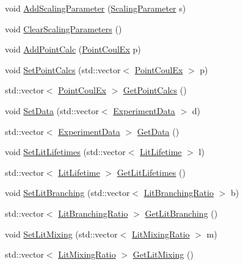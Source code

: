 \begin{DoxyCompactItemize}
\item 
void \hyperlink{classCoulExFitter_ab0bb6b9cb3f63281e4e310a359293e24}{Add\-Scaling\-Parameter} (\hyperlink{classScalingParameter}{Scaling\-Parameter} s)
\item 
void \hyperlink{classCoulExFitter_a379e336a5bf3534a68a2b30aae1b03d6}{Clear\-Scaling\-Parameters} ()
\item 
void \hyperlink{classCoulExFitter_aa61a8d54329e77a5a8ffc7d760a7acad}{Add\-Point\-Calc} (\hyperlink{classPointCoulEx}{Point\-Coul\-Ex} p)
\item 
void \hyperlink{classCoulExFitter_ad3dadcfe5be98bd37a9a0e10ba8866ef}{Set\-Point\-Calcs} (std\-::vector$<$ \hyperlink{classPointCoulEx}{Point\-Coul\-Ex} $>$ p)
\item 
std\-::vector$<$ \hyperlink{classPointCoulEx}{Point\-Coul\-Ex} $>$ \hyperlink{classCoulExFitter_af845588f78e360df8f1054b2b06b1320}{Get\-Point\-Calcs} ()
\item 
void \hyperlink{classCoulExFitter_a44ec14a6b681ac7feccdf2dc119a5450}{Set\-Data} (std\-::vector$<$ \hyperlink{classExperimentData}{Experiment\-Data} $>$ d)
\item 
std\-::vector$<$ \hyperlink{classExperimentData}{Experiment\-Data} $>$ \hyperlink{classCoulExFitter_a8bbef087dbeab8832c0cfb52b6b7f8de}{Get\-Data} ()
\item 
void \hyperlink{classCoulExFitter_a4404962fd56e3d1543061b5d141d655f}{Set\-Lit\-Lifetimes} (std\-::vector$<$ \hyperlink{classLitLifetime}{Lit\-Lifetime} $>$ l)
\item 
std\-::vector$<$ \hyperlink{classLitLifetime}{Lit\-Lifetime} $>$ \hyperlink{classCoulExFitter_a16cb5175295b5f14547db8dd63f95541}{Get\-Lit\-Lifetimes} ()
\item 
void \hyperlink{classCoulExFitter_a349703eec8df817afb031d536622af69}{Set\-Lit\-Branching} (std\-::vector$<$ \hyperlink{classLitBranchingRatio}{Lit\-Branching\-Ratio} $>$ b)
\item 
std\-::vector$<$ \hyperlink{classLitBranchingRatio}{Lit\-Branching\-Ratio} $>$ \hyperlink{classCoulExFitter_a74d75b806bee4687703d1611c7710ad8}{Get\-Lit\-Branching} ()
\item 
void \hyperlink{classCoulExFitter_a67e04682849c9234aa200006aa614f1a}{Set\-Lit\-Mixing} (std\-::vector$<$ \hyperlink{classLitMixingRatio}{Lit\-Mixing\-Ratio} $>$ m)
\item 
std\-::vector$<$ \hyperlink{classLitMixingRatio}{Lit\-Mixing\-Ratio} $>$ \hyperlink{classCoulExFitter_a7858f449e50acd52a3600e774ea06f89}{Get\-Lit\-Mixing} ()
\item 

\end{DoxyCompactItemize}
